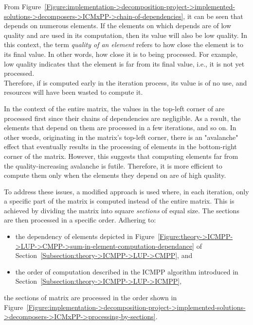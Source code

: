 From Figure~\ref{Figure:implementation->decomposition-project->implemented-solutions->decomposers->ICMxPP->chain-of-dependencies}, it can be seen that  depends on numerous elements. If the elements on which  depends are of low quality and are used in its computation, then its value will also be low quality. In this context, the term \textit{quality of an element} refers to how close the element is to its final value. In other words, how close it is to being processed. For example, low quality indicates that the element is far from its final value, i.e., it is not yet processed.\\
Therefore, if  is computed early in the iteration process, its value is of no use, and resources will have been wasted to compute it.

In the context of the entire matrix, the values in the top-left corner of  are processed first since their chains of dependencies are negligible. As a result, the elements that depend on them are processed in a few iterations, and so on. In other words, originating in the matrix's top-left corner, there is an "avalanche" effect that eventually results in the processing of elements in the bottom-right corner of the matrix. However, this suggests that computing elements far from the quality-increasing avalanche is futile. Therefore, it is more efficient to compute them only when the elements they depend on are of high quality.

To address these issues, a modified approach is used where, in each iteration, only a specific part of the matrix is computed instead of the entire matrix. This is achieved by dividing the matrix into square \textit{sections} of equal size. The sections are then processed in a specific order. Adhering to:

\begin{itemize}
	\item the dependency of elements depicted in Figure~\ref{Figure:theory->ICMPP->LUP->CMPP->sum-in-element-computation-dependance} of Section~\ref{Subsection:theory->ICMPP->LUP->CMPP}, and
	\item the order of computation described in the ICMPP algorithm introduced in Section~\ref{Subsection:theory->ICMPP->LUP->ICMPP},
\end{itemize}

the sections of matrix  are processed in the order shown in Figure~\ref{Figure:implementation->decomposition-project->implemented-solutions->decomposers->ICMxPP->processing-by-sections}.

